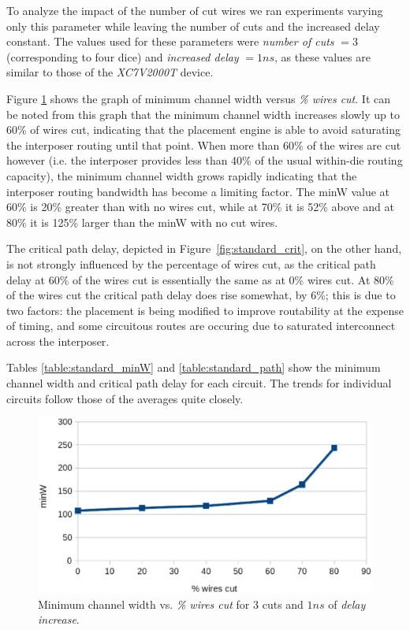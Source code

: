 \documentclass{sig-alternate-2013}
\begin{document}
To analyze the impact of the number of cut wires we ran experiments varying only this parameter while leaving the number of cuts and the increased delay constant. The values used for these parameters were \textit{number of cuts} $= 3$ (corresponding to four dice) and \textit{increased delay} $= 1ns$, as these values are similar to those of the \textit{XC7V2000T} device.

Figure \ref{fig:standard_minW} shows the graph of minimum channel width versus \textit{\% wires cut}. It can be noted from this graph that the minimum channel width increases slowly up to 60\% of wires cut, indicating that the placement engine is able to avoid saturating the interposer routing until that point. When more than 60\% of the wires are cut however (i.e. the interposer provides less than 40\% of the usual within-die routing capacity), the minimum channel width grows rapidly indicating that the interposer routing bandwidth has become a limiting factor. The minW value at 60\% is 20\% greater than with no wires cut, while at 70\% it is 52\% above and at 80\% it is 125\% larger than the minW with no cut wires.

The critical path delay, depicted in Figure~\ref{fig:standard_crit}, on the other hand, is not strongly influenced by the percentage of wires cut, as the critical path delay at 60\% of the wires cut is essentially the same as at 0\% wires cut. At 80\% of the wires cut the critical path delay does rise somewhat, by 6\%; this is due to two factors: the placement is being modified to improve routability at the expense of timing, and some circuitous routes are occuring due to saturated interconnect across the interposer.

Tables \ref{table:standard_minW} and \ref{table:standard_path} show the minimum channel width and critical path delay for each circuit. The trends for individual circuits follow those of the averages quite closely.

\begin{figure}[!htbp]
\centering
\includegraphics[width=\linewidth]{standard_minW.eps}
\caption{Minimum channel width vs. \textit{\% wires cut} for 3 cuts and $1ns$ of \textit{delay increase}.}
\label{fig:standard_minW}
\end{figure}
\end{document}
